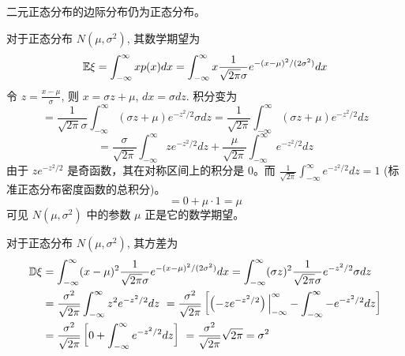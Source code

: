 \begin{remark}
    二元正态分布的边际分布仍为正态分布。
\end{remark}
\begin{proposition} \label{prop:normal_expectation}
对于正态分布 $N(\mu,\sigma^2)$, 其数学期望为
\[
\mathbb{E}\xi = \int_{-\infty}^\infty xp(x) dx = \int_{-\infty}^\infty x \frac{1}{\sqrt{2\pi}\sigma}e^{-(x-\mu)^2/(2\sigma^2)} dx
\]
令 $z = \frac{x-\mu}{\sigma}$, 则 $x = \sigma z + \mu$, $dx = \sigma dz$. 积分变为
\[
= \frac{1}{\sqrt{2\pi}\sigma} \int_{-\infty}^\infty (\sigma z + \mu) e^{-z^2/2} \sigma dz = \frac{1}{\sqrt{2\pi}} \int_{-\infty}^\infty (\sigma z + \mu) e^{-z^2/2} dz
\]
\[
= \frac{\sigma}{\sqrt{2\pi}} \int_{-\infty}^\infty z e^{-z^2/2} dz + \frac{\mu}{\sqrt{2\pi}} \int_{-\infty}^\infty e^{-z^2/2} dz
\]
由于 $z e^{-z^2/2}$ 是奇函数，其在对称区间上的积分是 $0$。而 $\frac{1}{\sqrt{2\pi}} \int_{-\infty}^\infty e^{-z^2/2} dz = 1$ (标准正态分布密度函数的总积分)。
\[
= 0 + \mu \cdot 1 = \mu
\]
可见 $N(\mu,\sigma^2)$ 中的参数 $\mu$ 正是它的数学期望。
\end{proposition}
\begin{proposition} \label{prop:normal_variance}
对于正态分布 $N(\mu,\sigma^2)$, 其方差为
\begin{align*}
\mathbb{D}\xi &= \int_{-\infty}^\infty (x - \mu)^2 \frac{1}{\sqrt{2\pi}\sigma}e^{-(x-\mu)^2/(2\sigma^2)} dx = \int_{-\infty}^\infty (\sigma z)^2 \frac{1}{\sqrt{2\pi}\sigma}e^{-z^2/2} \sigma dz \\
&= \frac{\sigma^2}{\sqrt{2\pi}} \int_{-\infty}^\infty z^2 e^{-z^2/2} dz \
= \frac{\sigma^2}{\sqrt{2\pi}} \left[ \left( -ze^{-z^2/2} \right) \Big|_{-\infty}^\infty - \int_{-\infty}^\infty -e^{-z^2/2} dz \right] \\
&= \frac{\sigma^2}{\sqrt{2\pi}} \left[ 0 + \int_{-\infty}^{\infty} e^{-z^2/2} dz \right]\
= \frac{\sigma^2}{\sqrt{2\pi}} \sqrt{2\pi} 
= \sigma^2
\end{align*}
\end{proposition}
